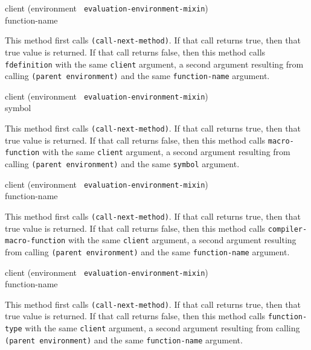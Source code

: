 {\small{} {client (environment {\tt
      evaluation-environment-mixin}) \\ function-name}
}

This method first calls \texttt{(call-next-method)}.  If that call
returns true, then that true value is returned.  If that call returns
false, then this method calls \texttt{fdefinition} with the same
\texttt{client} argument, a second argument resulting from calling
\texttt{(parent environment)} and the same \texttt{function-name}
argument.

{\small{} {client (environment {\tt
      evaluation-environment-mixin}) \\ symbol}
}

This method first calls \texttt{(call-next-method)}.  If that call
returns true, then that true value is returned.  If that call returns
false, then this method calls \texttt{macro-function} with the same
\texttt{client} argument, a second argument resulting from calling
\texttt{(parent environment)} and the same \texttt{symbol}
argument.

{\small{} {client (environment {\tt
      evaluation-environment-mixin}) \\ function-name}
}

This method first calls \texttt{(call-next-method)}.  If that call
returns true, then that true value is returned.  If that call returns
false, then this method calls \texttt{compiler-macro-function} with
the same \texttt{client} argument, a second argument resulting from
calling \texttt{(parent environment)} and the same
\texttt{function-name} argument.

{\small{} {client (environment {\tt
      evaluation-environment-mixin}) \\ function-name}
}

This method first calls \texttt{(call-next-method)}.  If that call
returns true, then that true value is returned.  If that call returns
false, then this method calls \texttt{function-type} with the same
\texttt{client} argument, a second argument resulting from calling
\texttt{(parent environment)} and the same \texttt{function-name}
argument.
